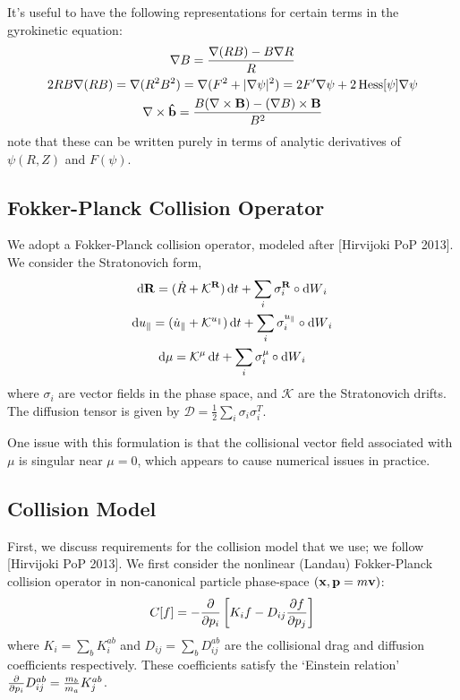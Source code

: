 \documentclass[]{article}
\begin{document}
It's useful to have the following representations for certain terms in the gyrokinetic equation:
\begin{gather*}
	\nabla B = \frac{\nabla(RB) - B \nabla R}{R} \\
	2 RB \nabla(RB) = \nabla(R^2B^2) = \nabla(F^2 + |\nabla\psi|^2) = 2 F' \nabla \psi + 2 \operatorname{Hess}[\psi] \nabla \psi \\
	\nabla \times \vu{b} = \frac{B (\nabla \times \vb{B}) - (\nabla B) \times \vb{B}}{B^2}
\end{gather*}
note that these can be written purely in terms of analytic derivatives of \(\psi(R,Z)\) and \(F(\psi)\).


\subsection{Fokker-Planck Collision Operator}

We adopt a Fokker-Planck collision operator, modeled after [Hirvijoki PoP 2013].
We consider the Stratonovich form,
\begin{subequations}
	\begin{gather}
		\dd{\vb{R}} = (\dot{R} + \mathcal{K}^{\vb{R}}) \dd{t} + \sum_{i} \sigma^{\vb{R}}_i \circ \dd{W}_i \\
		\dd{u_\parallel} = (\dot{u}_\parallel + \mathcal{K}^{u_\parallel}) \dd{t} + \sum_{i} \sigma^{u_\parallel}_i \circ \dd{W}_i \\
		\dd{\mu} = \mathcal{K}^\mu \dd{t} + \sum_{i} \sigma^\mu_i \circ \dd{W}_i
	\end{gather}
\end{subequations}
where \(\sigma_i\) are vector fields in the phase space, and \(\mathcal{K}\) are the Stratonovich drifts.
The diffusion tensor is given by \(\mathcal{D} = \frac{1}{2} \sum_i \sigma_i \sigma_i^T\).

One issue with this formulation is that the collisional vector field associated with \(\mu\) is singular near \(\mu = 0\), which appears to cause numerical issues in practice.



\subsection{Collision Model}

First, we discuss requirements for the collision model that we use; we follow [Hirvijoki PoP 2013].
We first consider the nonlinear (Landau) Fokker-Planck collision operator in non-canonical particle phase-space \((\vb{x}, \vb{p} = m\vb{v})\):
\begin{equation*}
	C[f] = -\pdv{p_i} \left[K_i f - D_{ij} \pdv{f}{p_j}\right]
\end{equation*}
where \(K_i = \sum_b K_i^{ab}\) and \(D_{ij} = \sum_b D_{ij}^{ab}\) are the collisional drag and diffusion coefficients respectively.
These coefficients satisfy the `Einstein relation' \(\pdv{p_i} D_{ij}^{ab} = \frac{m_b}{m_a} K_j^{ab}\).
\end{document}
